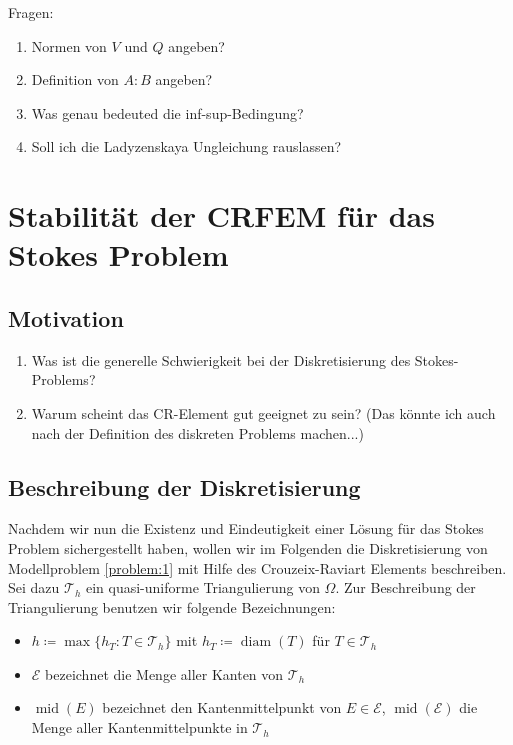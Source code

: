 \message{ !name(script.tex)}\documentclass[a4paper]{scrartcl}
\newcommand{\mesh}{\mathcal{T}_h}
\newcommand{\edges}{\mathcal{E}}
\DeclareMathOperator{\diam}{diam}
\DeclareMathOperator{\midOp}{mid}
\theoremstyle{plain}
\theoremstyle{definition}
\theoremstyle{remark}
\begin{document}
{\color{red}
  \noindent Fragen: 
  \begin{enumerate}
  \item Normen von \(V\) und \(Q\) angeben?
  \item Definition von \(A:B\) angeben?
  \item Was genau bedeuted die inf-sup-Bedingung?
  \item Soll ich die Ladyzenskaya Ungleichung rauslassen? 
  \end{enumerate}
}


\section{Stabilität der CRFEM für das Stokes Problem}
\label{sec:stabilitat-der-crfem}

\subsection{Motivation}
\label{sec:motivation}

{\color{red}
  \begin{enumerate}
  \item Was ist die generelle Schwierigkeit bei der Diskretisierung
    des Stokes-Problems?
  \item Warum scheint das CR-Element gut geeignet zu sein? (Das könnte
    ich auch nach der Definition des diskreten Problems machen...)
  \end{enumerate}
}


\subsection{Beschreibung der Diskretisierung}
\label{sec:beschr-der-diskr}

Nachdem wir nun die Existenz und Eindeutigkeit einer Lösung für das
Stokes Problem sichergestellt haben, wollen wir im Folgenden die
Diskretisierung von Modellproblem \ref{problem:1} mit Hilfe des
Crouzeix-Raviart Elements beschreiben. \\

\noindent Sei dazu \(\mesh\) ein quasi-uniforme Triangulierung von
\(\Omega\). Zur Beschreibung der Triangulierung benutzen wir folgende
Bezeichnungen: 
\begin{itemize}
\item \(h \coloneqq \max\{h_T\colon T \in \mesh\}\) mit \(h_T \coloneqq \diam(T)\) für \(T\in \mesh\)
\item \(\edges\) bezeichnet die Menge aller Kanten von \(\mesh\)
\item \(\midOp(E)\) bezeichnet den Kantenmittelpunkt von \(E \in
  \edges\), \(\midOp(\edges)\) die Menge aller Kantenmittelpunkte in \(\mesh\)
\end{itemize}
\end{document}
